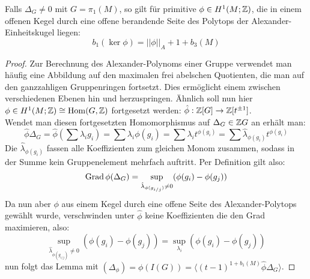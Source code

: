 \begin{lem}
\label{lem:alexnorm}
	Falls $\Delta_G \neq 0$ mit $G=\pi_1(M)$, so gilt für primitive $\phi \in H^1(M;\mathbb{Z})$, die in einem offenen Kegel durch eine offene berandende Seite des Polytops der Alexander-Einheitskugel liegen:
	\[
		b_1(\ker\phi) = ||\phi||_A + 1 + b_3(M)
	\]
\end{lem}
\begin{proof}
	Zur Berechnung des Alexander-Polynoms einer Gruppe verwendet man häufig eine Abbildung auf den maximalen frei abelschen Quotienten, die man auf den ganzzahligen Gruppenringen fortsetzt. Dies ermöglicht einem zwischen verschiedenen Ebenen hin und herzuspringen. Ähnlich soll nun hier $\phi \in H^1(M;\mathbb{Z}) \cong \operatorname{Hom}(G,\mathbb{Z}) $ fortgesetzt werden: $		\hat \phi:\mathbb{Z}[G] \to \mathbb{Z}[t^{\pm 1}]$.\\
	Wendet man diesen fortgesetzten Homomorphismus auf $\Delta_G\in \mathbb{Z} G$ an erhält man: \[
		\hat \phi \Delta_G = \hat \phi (\sum \lambda_i g_i)= \sum \lambda_i \phi(g_i) = \sum \lambda_i t^{\phi(g_i)} = \sum \hat \lambda_{\phi(g_i)} t^{\phi(g_i)}
	\]
	Die $\hat \lambda_{\phi(g_i)}$ fassen alle Koeffizienten zum gleichen Monom zusammen, sodass in der Summe kein Gruppenelement mehrfach auftritt. Per Definition gilt also:
	\[
		\operatorname{Grad} \phi(\Delta_G) = \sup_{\hat \lambda_{\phi(g_{i/j})} \neq 0} (\phi(g_i)- \phi(g_j))
	\]
	Da nun aber $\phi$ aus einem Kegel durch eine offene Seite des Alexander-Polytops gewählt wurde, verschwinden unter $\hat \phi$ keine Koeffizienten die den Grad maximieren, also:
	\[
		\sup_{\hat \lambda_{\phi(g_{i/j})} \neq 0} (\phi(g_i)- \phi(g_j)) = \sup_{\lambda_i}(\phi(g_i)- \phi(g_j))
	\]
	nun folgt das Lemma mit $(\Delta_\phi)=\phi(I(G))=\langle(t-1)^{1+b_1(M)}\hat\phi\Delta_G \rangle	$.
\end{proof}

